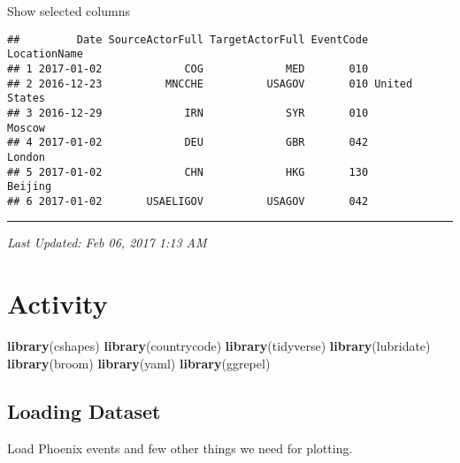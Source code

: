 \documentclass[]{article}
\newenvironment{Shaded}{\begin{snugshade}}{\end{snugshade}}
\newcommand{\KeywordTok}[1]{\textcolor[rgb]{0.13,0.29,0.53}{\textbf{{#1}}}}
\newcommand{\StringTok}[1]{\textcolor[rgb]{0.31,0.60,0.02}{{#1}}}
\newcommand{\NormalTok}[1]{{#1}}
\begin{document}
Show selected columns

\begin{Shaded}
\end{Shaded}

\begin{verbatim}
##         Date SourceActorFull TargetActorFull EventCode  LocationName
## 1 2017-01-02             COG             MED       010              
## 2 2016-12-23          MNCCHE          USAGOV       010 United States
## 3 2016-12-29             IRN             SYR       010        Moscow
## 4 2017-01-02             DEU             GBR       042        London
## 5 2017-01-02             CHN             HKG       130       Beijing
## 6 2017-01-02       USAELIGOV          USAGOV       042
\end{verbatim}

\begin{center}\rule{0.5\linewidth}{\linethickness}\end{center}

\emph{Last Updated: Feb 06, 2017 1:13 AM}

\section{Activity}\label{activity}

\begin{Shaded}
\begin{Highlighting}[]
\KeywordTok{library}\NormalTok{(cshapes)}
\KeywordTok{library}\NormalTok{(countrycode)}
\KeywordTok{library}\NormalTok{(tidyverse)}
\KeywordTok{library}\NormalTok{(lubridate)}
\KeywordTok{library}\NormalTok{(broom)}
\KeywordTok{library}\NormalTok{(yaml)}
\KeywordTok{library}\NormalTok{(ggrepel)}
\end{Highlighting}
\end{Shaded}

\subsection{Loading Dataset}\label{loading-dataset}

Load Phoenix events and few other things we need for plotting.
\end{document}
